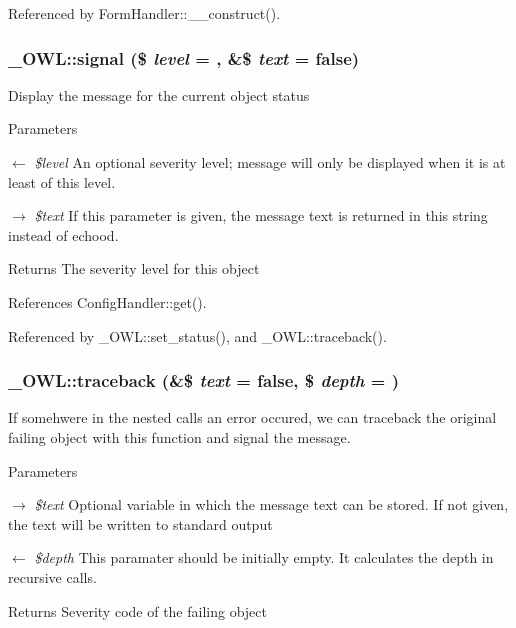 Referenced by FormHandler::\_\-\_\-construct().

\subsubsection[{signal}]{\setlength{\rightskip}{0pt plus 5cm}\_\-OWL::signal (\$ {\em level} = {}, \/  \&\$ {\em text} = {\ttfamily false})}\label{class__OWL_a51ba4a16409acf2a2f61f286939091a5}
Display the message for the current object status


\begin{DoxyParams}{Parameters}
\item[\mbox{$\leftarrow$} {\em \$level}]An optional severity level; message will only be displayed when it is at least of this level. \item[\mbox{$\rightarrow$} {\em \$text}]If this parameter is given, the message text is returned in this string instead of echood. \end{DoxyParams}
\begin{DoxyReturn}{Returns}
The severity level for this object 
\end{DoxyReturn}


References ConfigHandler::get().



Referenced by \_\-OWL::set\_\-status(), and \_\-OWL::traceback().

\subsubsection[{traceback}]{\setlength{\rightskip}{0pt plus 5cm}\_\-OWL::traceback (\&\$ {\em text} = {\ttfamily false}, \/  \$ {\em depth} = {})}\label{class__OWL_aa29547995d6741b7d2b90c1d4ea99a13}
If somehwere in the nested calls an error occured, we can traceback the original failing object with this function and signal the message.


\begin{DoxyParams}{Parameters}
\item[\mbox{$\rightarrow$} {\em \$text}]Optional variable in which the message text can be stored. If not given, the text will be written to standard output \item[\mbox{$\leftarrow$} {\em \$depth}]This paramater should be initially empty. It calculates the depth in recursive calls. \end{DoxyParams}
\begin{DoxyReturn}{Returns}
Severity code of the failing object 
\end{DoxyReturn}


